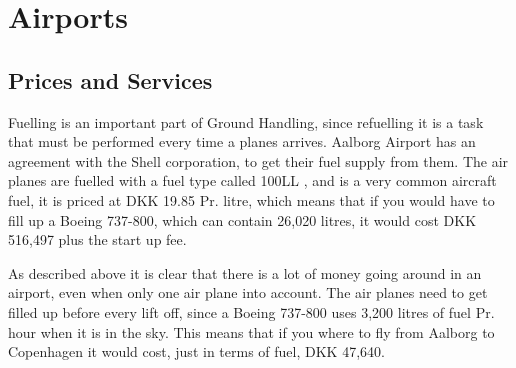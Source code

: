 \chapter{Airports}
\section{Prices and Services}

Fuelling is an important part of Ground Handling, since refuelling it is a task that must be performed every time a planes arrives. Aalborg Airport has an agreement with the Shell corporation, to get their fuel supply from them. The air planes are fuelled with a fuel type called 100LL \cite{iaopa_fuelprices}, and is a very common aircraft fuel, it is priced at DKK 19.85 Pr. litre, which means that if you would have to fill up a Boeing 737-800, which can contain 26,020 litres\cite{737_specs}, it would cost DKK 516,497 plus the start up fee.

As described above it is clear that there is a lot of money going around in an airport, even when only one air plane into account. The air planes need to get filled up before every lift off, since a Boeing 737-800 uses 3,200 litres of fuel Pr. hour when it is in the sky. This means that if you where to fly from Aalborg to Copenhagen it would cost, just in terms of fuel, DKK 47,640.

%
